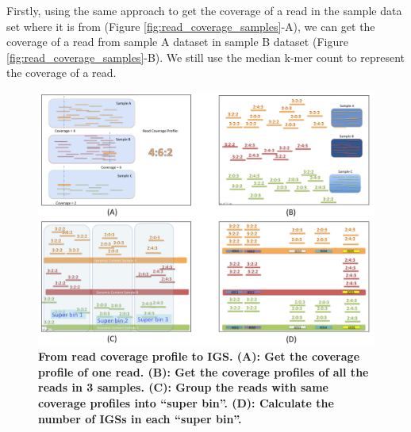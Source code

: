 Firstly, using the same approach to get the coverage of a read in the sample data set where it is from 
(Figure \ref{fig:read_coverage_samples}-A), we can get the coverage of a read from sample A dataset in 
 sample B dataset (Figure \ref{fig:read_coverage_samples}-B). We still use the median k-mer count to represent 
the coverage of a read.  

\begin{figure}[!ht]
 \centerline{\includegraphics[width=6in]{./figures/coverage_profile.png}}
 \caption{\bf From read coverage profile to IGS. (A): Get the coverage profile of one read. (B): Get the coverage
 profiles of all the reads in 3 samples. (C): Group the reads with same coverage profiles into ``super bin''. 
 (D): Calculate the number of IGSs in each ``super bin''.}
\label{fig:coverage_profile}
\end{figure}

